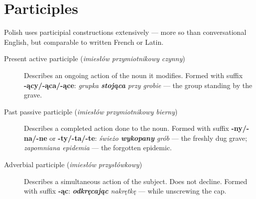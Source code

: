 \section{Participles}

Polish uses participial constructions extensively — more so than 
conversational English, but comparable to written French or Latin.

\begin{description}
  \item[Present active participle (\textit{imiesłów przymiotnikowy czynny})] 
    Describes an ongoing action of the noun it modifies. 
    Formed with suffix \textbf{-ący/-ąca/-ące}: 
    \textit{grupka \textbf{stojąca} przy grobie} — the group standing by the grave.
  \item[Past passive participle (\textit{imiesłów przymiotnikowy bierny})] 
    Describes a completed action done to the noun. 
    Formed with suffix \textbf{-ny/-na/-ne} or \textbf{-ty/-ta/-te}: 
    \textit{świeżo \textbf{wykopany} grób} — the freshly dug grave; 
    \textit{zapomniana epidemia} — the forgotten epidemic.
  \item[Adverbial participle (\textit{imiesłów przysłówkowy})] 
    Describes a simultaneous action of the subject. Does not decline. 
    Formed with suffix \textbf{-ąc}: 
    \textit{\textbf{odkręcając} nakrętkę} — while unscrewing the cap.
\end{description}

